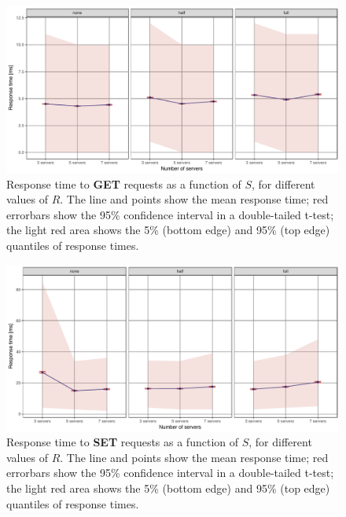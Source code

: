 \documentclass[11pt]{article}
\begin{document}
\begin{figure}[h]
\centering
\includegraphics[width=\textwidth]{../results/replication/graphs/response_time_vs_servers_get.pdf}
\caption{Response time to \textbf{GET} requests as a function of $S$, for different values of $R$. The line and points show the mean response time; red errorbars show the 95\% confidence interval in a double-tailed t-test; the light red area shows the 5\% (bottom edge) and 95\% (top edge) quantiles of response times.}
\label{fig:exp2:res:servers:get}
\end{figure}
 

\begin{figure}[h]
\centering
\includegraphics[width=\textwidth]{../results/replication/graphs/response_time_vs_servers_set.pdf}
\caption{Response time to \textbf{SET} requests as a function of $S$, for different values of $R$. The line and points show the mean response time; red errorbars show the 95\% confidence interval in a double-tailed t-test; the light red area shows the 5\% (bottom edge) and 95\% (top edge) quantiles of response times.}
\label{fig:exp2:res:servers:set}
\end{figure}
\end{document}
